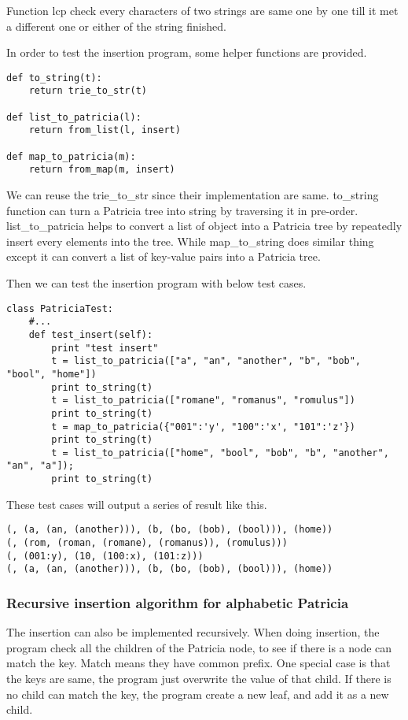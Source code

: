 \documentclass{article}
\begin{document}
Function lcp check every characters of two strings are same one by one
till it met a different one or either of the string finished.

In order to test the insertion program, some helper functions are
provided.

\begin{lstlisting}
def to_string(t):
    return trie_to_str(t)

def list_to_patricia(l):
    return from_list(l, insert)

def map_to_patricia(m):
    return from_map(m, insert)
\end{lstlisting}

We can reuse the trie\_to\_str since their implementation are same.
to\_string function can turn a Patricia tree into string by traversing it
in pre-order. list\_to\_patricia helps to convert a list of object into
a Patricia tree by repeatedly insert every elements into the tree. While
map\_to\_string does similar thing except it can convert a list of key-value
pairs into a Patricia tree.

Then we can test the insertion program with below test cases.

\begin{lstlisting}
class PatriciaTest:
    #...
    def test_insert(self):
        print "test insert"
        t = list_to_patricia(["a", "an", "another", "b", "bob", "bool", "home"])
        print to_string(t)
        t = list_to_patricia(["romane", "romanus", "romulus"])
        print to_string(t)
        t = map_to_patricia({"001":'y', "100":'x', "101":'z'})
        print to_string(t)
        t = list_to_patricia(["home", "bool", "bob", "b", "another", "an", "a"]);
        print to_string(t)
\end{lstlisting}

These test cases will output a series of result like this.

\begin{verbatim}
(, (a, (an, (another))), (b, (bo, (bob), (bool))), (home))
(, (rom, (roman, (romane), (romanus)), (romulus)))
(, (001:y), (10, (100:x), (101:z)))
(, (a, (an, (another))), (b, (bo, (bob), (bool))), (home))
\end{verbatim}

\subsubsection{Recursive insertion algorithm for alphabetic Patricia}

The insertion can also be implemented recursively. When doing
insertion, the program check all the children of the Patricia node, to
see if there is a node can match the key. Match means they have common
prefix. One special case is that the keys are same, the program just
overwrite the value of that child. If there is no child can match the
key, the program create a new leaf, and add it as a new child.
\end{document}
